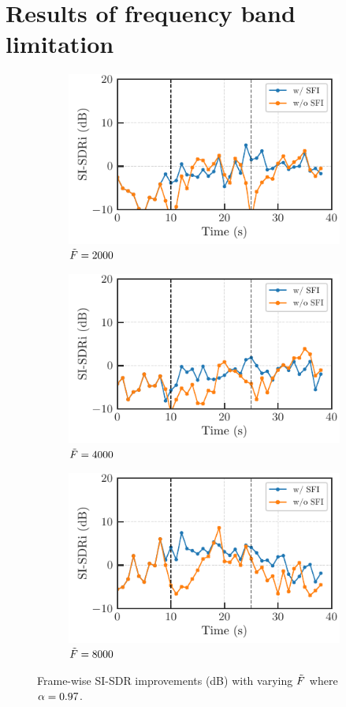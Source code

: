 \documentclass{article}
\begin{document}
\section*{Results of frequency band limitation}
\newcommand{\myscale}{.75}
\begin{figure}[h]
  \centering
  \begin{subfigure}[t]{.3\textwidth}
    \includegraphics[scale=\myscale]{figures/plots/online/Gauss_2000_97.pdf}
    \caption{$\tilde{F} = 2000$}
  \end{subfigure}
  \begin{subfigure}[t]{.3\textwidth}
    \includegraphics[scale=\myscale]{figures/plots/online/Gauss_4000_97.pdf}
    \caption{$\tilde{F} = 4000$}
  \end{subfigure}
  \begin{subfigure}[t]{.3\textwidth}
    \includegraphics[scale=\myscale]{figures/plots/online/Gauss_8000_97.pdf}
    \caption{$\tilde{F} = 8000$}
  \end{subfigure}
  \caption{Frame-wise SI-SDR improvements (dB) with varying $\tilde{F}$ where $\alpha = 0.97$.}
  \label{fig:online:97}
\end{figure}
\end{document}
